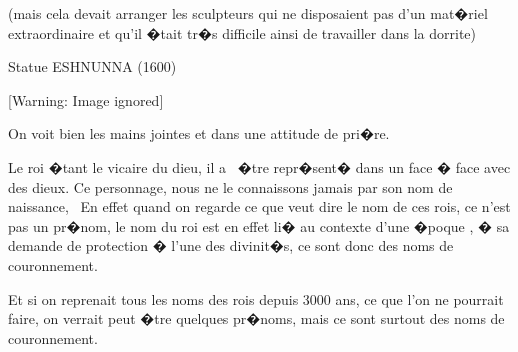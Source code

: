 \documentclass{article}
\begin{document}
(mais cela devait arranger les sculpteurs qui ne disposaient pas d'un mat�riel extraordinaire et qu'il �tait tr�s difficile ainsi de travailler dans la dorrite)


\bigskip


\bigskip


\bigskip


\bigskip


\bigskip


\bigskip


\bigskip


\bigskip


\bigskip


\bigskip


\bigskip


\bigskip


\bigskip


\bigskip


\bigskip


\bigskip


\bigskip


\bigskip


\bigskip

Statue ESHNUNNA (1600) 


\bigskip

  [Warning: Image ignored] %
 


\bigskip

On voit bien les mains jointes et dans une attitude de pri�re.


\bigskip


\bigskip


\bigskip


\bigskip

Le roi �tant le vicaire du dieu, il a \ �tre repr�sent� dans un face � face avec des dieux. Ce personnage, nous ne le connaissons jamais par son nom de naissance, \ En effet quand on regarde ce que veut dire le nom de ces rois, ce n'est pas un pr�nom, le nom du roi est en effet li� au contexte d'une �poque , � sa demande de protection � l'une des divinit�s, ce sont donc des noms de couronnement.

Et si on reprenait tous les noms des rois depuis 3000 ans, ce que l'on ne pourrait faire, on verrait peut �tre quelques pr�noms, mais ce sont surtout des noms de couronnement.


\bigskip
\end{document}
